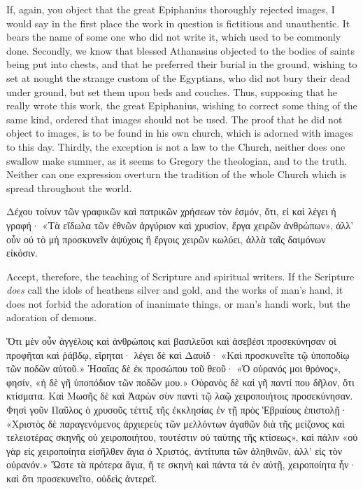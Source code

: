 \documentclass[10pt]{book}
\newcommand{\switchgreek}[1][]{\selectlanguage{polutonikogreek} \switchcolumn*[#1]}
\newcommand{\switchenglish}{\selectlanguage{english} \switchcolumn}
\begin{document}
\begin{paracol}{2}
If, again, you object that the great Epiphanius thoroughly rejected images, I would say 
in the first place the work in question is fictitious and unauthentic. It bears the name of 
some one who did not write it, which used to 
be commonly done. Secondly, we know that 
blessed Athanasius objected to the bodies of 
saints being put into chests, and that he 
preferred their burial in the ground, wishing 
to set at nought the strange custom of the 
Egyptians, who did not bury their dead under 
ground, but set them upon beds and couches. 
Thus, supposing that he really wrote this work, 
the great Epiphanius, wishing to correct some 
thing of the same kind, ordered that images 
should not be used. The proof that he did 
not object to images, is to be found in his 
own church, which is adorned with images 
to this day. Thirdly, the exception is not a 
law to the Church, neither does one swallow 
make summer, as it seems to Gregory the 
theologian, and to the truth. Neither can one 
expression overturn the tradition of the whole 
Church which is spread throughout the world. 

\switchgreek

Δέχου τοίνυν τῶν γραφικῶν καὶ πατρικῶν χρήσεων τὸν ἑσμόν, ὅτι, εἰ καὶ λέγει ἡ γραφή· «Τὰ εἴδωλα τῶν ἐθνῶν ἀργύριον καὶ χρυσίον, ἔργα χειρῶν ἀνθρώπων», ἀλλ’ οὖν οὐ τὸ μὴ προσκυνεῖν ἀψύχοις ἢ ἔργοις χειρῶν κωλύει, ἀλλὰ ταῖς δαιμόνων εἰκόσιν.

\switchenglish

Accept, therefore, the teaching of Scripture 
and spiritual writers. If the Scripture \emph{does} call 
the idols of heathens silver and gold, and the 
works of man's hand, it does not forbid the 
adoration of inanimate things, or man's handi 
work, but the adoration of demons. 

\switchgreek

Ὅτι μὲν οὖν ἀγγέλοις καὶ ἀνθρώποις καὶ βασιλεῦσι καὶ ἀσεβέσι προσεκύνησαν οἱ προφῆται καὶ ῥάβδῳ, εἴρηται· λέγει δὲ καὶ Δαυίδ· «Καὶ προσκυνεῖτε τῷ ὑποποδίῳ τῶν ποδῶν αὐτοῦ.»
Ἡσαΐας δὲ ἐκ προσώπου τοῦ θεοῦ· «Ὁ οὐρανός μοι θρόνος», φησίν, «ἡ δὲ γῆ ὑποπόδιον τῶν ποδῶν μου.»
Οὐρανὸς δὲ καὶ γῆ παντί που δῆλον, ὅτι κτίσματα.
Καὶ Μωσῆς δὲ καὶ Ἀαρὼν σὺν παντὶ τῷ λαῷ χειροποιήτοις προσεκύνησαν.
Φησὶ γοῦν Παῦλος ὁ χρυσοῦς τέττιξ τῆς ἐκκλησίας ἐν τῇ πρὸς Ἑβραίους ἐπιστολῇ·
«Χριστὸς δὲ παραγενόμενος ἀρχιερεὺς τῶν μελλόντων ἀγαθῶν διὰ τῆς μείζονος καὶ
τελειοτέρας σκηνῆς οὐ χειροποιήτου, τουτέστιν οὐ ταύτης τῆς κτίσεως», καὶ
πάλιν «οὐ γὰρ εἰς χειροποίητα εἰσῆλθεν ἅγια ὁ Χριστός, ἀντίτυπα τῶν ἀληθινῶν,
ἀλλ’ εἰς τὸν οὐρανόν.»
Ὥστε τὰ πρότερα ἅγια, ἥ τε σκηνὴ καὶ πάντα τὰ ἐν αὐτῇ, χειροποίητα ἦν· καὶ ὅτι προσεκυνεῖτο, οὐδεὶς ἀντερεῖ.


\end{paracol}
\end{document}
